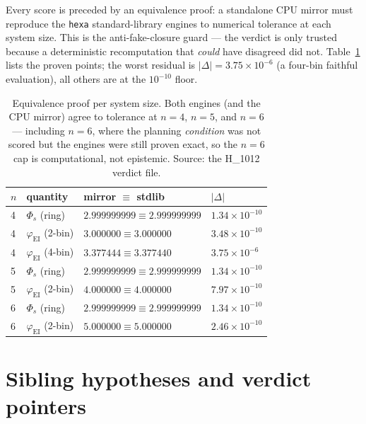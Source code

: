 \documentclass[11pt,a4paper]{article}
\newcommand{\faithful}{\ensuremath{\varphi_{\mathrm{EI}}}}
\newcommand{\bigphi}{\ensuremath{\Phi_{s}}}
\begin{document}
Every score is preceded by an equivalence proof: a standalone CPU mirror must
reproduce the \texttt{hexa} standard-library engines to numerical tolerance at
each system size. This is the anti-fake-closure guard --- the verdict is only
trusted because a deterministic recomputation that \emph{could} have disagreed
did not. Table~\ref{tab:equiv} lists the proven points; the worst residual is
$|\Delta|=3.75\times10^{-6}$ (a four-bin faithful evaluation), all others are
at the $10^{-10}$ floor.

\begin{table}[h]
\centering
\small
\begin{tabular}{llll}
\toprule
$n$ & quantity & mirror $\equiv$ stdlib & $|\Delta|$ \\
\midrule
4 & \bigphi{} (ring)        & $2.999999999 \equiv 2.999999999$ & $1.34\times10^{-10}$ \\
4 & \faithful{} (2-bin)     & $3.000000 \equiv 3.000000$       & $3.48\times10^{-10}$ \\
4 & \faithful{} (4-bin)     & $3.377444 \equiv 3.377440$       & $3.75\times10^{-6}$  \\
5 & \bigphi{} (ring)        & $2.999999999 \equiv 2.999999999$ & $1.34\times10^{-10}$ \\
5 & \faithful{} (2-bin)     & $4.000000 \equiv 4.000000$       & $7.97\times10^{-10}$ \\
6 & \bigphi{} (ring)        & $2.999999999 \equiv 2.999999999$ & $1.34\times10^{-10}$ \\
6 & \faithful{} (2-bin)     & $5.000000 \equiv 5.000000$       & $2.46\times10^{-10}$ \\
\bottomrule
\end{tabular}
\caption{Equivalence proof per system size. Both engines (and the CPU mirror)
agree to tolerance at $n=4$, $n=5$, and $n=6$ --- including $n=6$, where the
planning \emph{condition} was not scored but the engines were still proven
exact, so the $n=6$ cap is computational, not epistemic. Source: the H\_1012
verdict file.}
\label{tab:equiv}
\end{table}

\section{Sibling hypotheses and verdict pointers}
\label{app:siblings}
\end{document}
